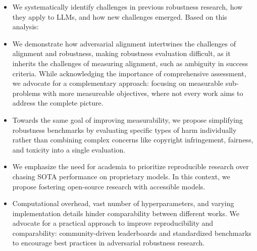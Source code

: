 \begin{itemize}[noitemsep,nolistsep,topsep=-2pt,leftmargin=0.6cm] 
    \item We systematically identify challenges in previous robustness research, how they apply to LLMs, and how new challenges emerged. Based on this analysis: 
    \item We demonstrate how adversarial alignment intertwines the challenges of alignment and robustness, making robustness evaluation difficult, as it inherits the challenges of measuring alignment, such as ambiguity in success criteria. 
    While acknowledging the importance of comprehensive assessment, we advocate for a complementary approach: focusing on measurable sub-problems with more measureable objectives, where not every work aims to address the complete picture.
    
    \item Towards the same goal of improving measurability, we propose simplifying robustness benchmarks by evaluating specific types of harm individually rather than combining complex concerns like copyright infringement, fairness, and toxicity into a single evaluation.
    
    \item We emphasize the need for academia to prioritize reproducible research over chasing SOTA performance on proprietary models. In this context, we propose fostering open-source research with accessible models. %
    \item Computational overhead, vast number of hyperparameters, and varying implementation details hinder comparability between different works. We advocate for a practical approach to improve reproducibility and comparability: community-driven leaderboards and standardized benchmarks to encourage best practices in adversarial robustness research.  


\end{itemize}
